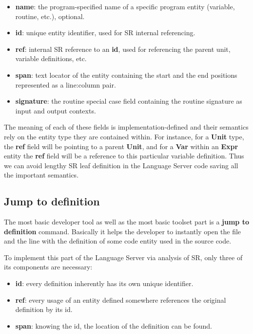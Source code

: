 \begin{itemize}
    \item \textbf{name}: the program-specified name of a specific program entity (variable, routine, etc.), optional.
    \item \textbf{id}:   unique entity identifier, used for SR internal referencing.
    \item \textbf{ref}:  internal SR reference to an \textbf{id}, used for referencing the parent unit, variable definitions, etc.
    \item \textbf{span}: text locator of the entity containing the start and the end positions represented as a line:column pair.
    \item \textbf{signature}: the routine special case field containing the routine signature as input and output contexts.
\end{itemize}

The meaning of each of these fields is implementation-defined and their semantics rely on the entity type they are contained within.
For instance, for a \textbf{Unit} type, the \textbf{ref} field will be pointing to a parent \textbf{Unit},
and for a \textbf{Var} within an \textbf{Expr} entity the \textbf{ref} field will be a reference to this particular variable definition.
Thus we can avoid lengthy SR leaf definition in the Language Server code saving all the important semantics.

\subsection{Jump to definition}

The most basic developer tool as well as the most basic toolset part is a \textbf{jump to definition} command.
Basically it helps the developer to instantly open the file and the line with the definition of some code entity used in the source code.

To implement this part of the Language Server via analysis of SR, only three of its components are necessary:

\begin{itemize}
    \item \textbf{id}:   every definition inherently has its own unique identifier.
    \item \textbf{ref}:  every usage of an entity defined somewhere references the original definition by its id.
    \item \textbf{span}: knowing the id, the location of the definition can be found.
\end{itemize}

